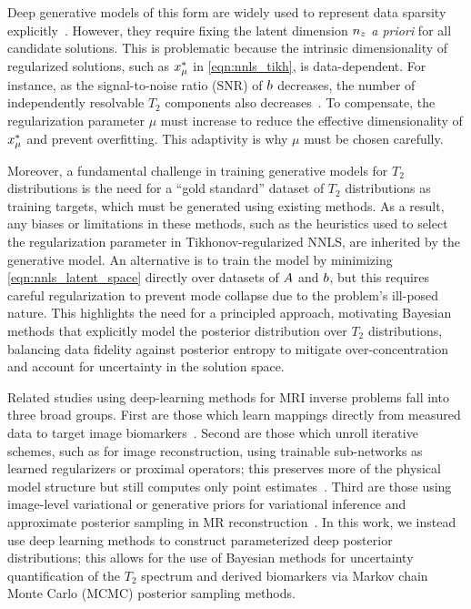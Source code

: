 Deep generative models of this form are widely used to represent data sparsity explicitly~\citep{bora_compressed_2017,liu_towards_2021,daras_intermediate_2021}.
However, they require fixing the latent dimension $n_{z}$ \textit{a priori} for all candidate solutions.
This is problematic because the intrinsic dimensionality of regularized solutions, such as $x^*_{\mu}$ in \eqref{eqn:nnls_tikh}, is data-dependent.
For instance, as the signal-to-noise ratio (\gls*{SNR}) of $b$ decreases, the number of independently resolvable $T_2$ components also decreases~\citep{istratov_exponential_1999}.
To compensate, the regularization parameter $\mu$ must increase to reduce the effective dimensionality of $x^*_{\mu}$ and prevent overfitting.
This adaptivity is why $\mu$ must be chosen carefully.

Moreover, a fundamental challenge in training generative models for $T_2$ distributions is the need for a ``gold standard'' dataset of $T_2$ distributions as training targets, which must be generated using existing methods.
As a result, any biases or limitations in these methods, such as the heuristics used to select the regularization parameter in Tikhonov-regularized \gls*{NNLS}, are inherited by the generative model.
An alternative is to train the model by minimizing \eqref{eqn:nnls_latent_space} directly over datasets of $A$ and $b$, but this requires careful regularization to prevent mode collapse due to the problem's ill-posed nature.
This highlights the need for a principled approach, motivating Bayesian methods that explicitly model the posterior distribution over $T_2$ distributions, balancing data fidelity against posterior entropy to mitigate over-concentration and account for uncertainty in the solution space.

Related studies using deep-learning methods for \gls*{MRI} inverse problems fall into three broad groups.
First are those which learn mappings directly from measured data to target image biomarkers~\citep{yoon_quantitative_2018,vasylechko_improved_2024,piredda_data-driven_2022}.
Second are those which unroll iterative schemes, such as for image reconstruction, using trainable sub-networks as learned regularizers or proximal operators;
this preserves more of the physical model structure but still computes only point estimates~\citep{yang_deep_2016,hammernik_variational_2018,kames_training_2019}.
Third are those using image-level variational or generative priors for variational inference and approximate posterior sampling in \gls*{MR} reconstruction~\citep{tonolini_variational_2019,jalal_robust_2021,chung_score-based_2022,luo_bayesian_2023}.
In this work, we instead use deep learning methods to construct parameterized deep posterior distributions;
this allows for the use of Bayesian methods for uncertainty quantification of the $T_2$ spectrum and derived biomarkers via Markov chain Monte Carlo (\gls*{MCMC}) posterior sampling methods.

